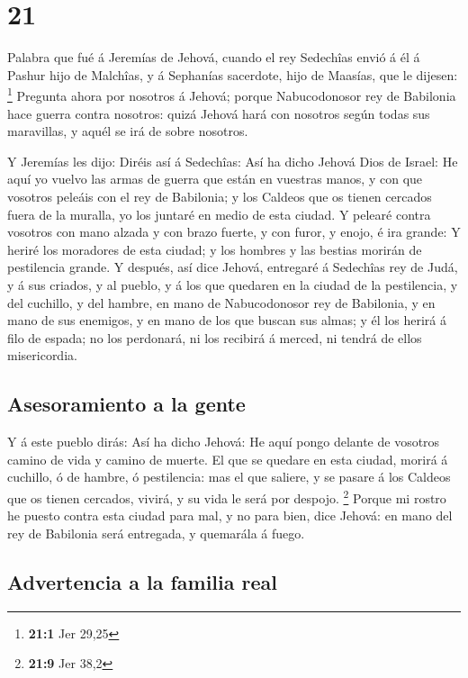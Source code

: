 \hypertarget{section-20}{%
\section{21}\label{section-20}}

 Palabra que fué á Jeremías de Jehová, cuando el rey
Sedechîas envió á él á Pashur hijo de Malchîas, y á Sephanías sacerdote,
hijo de Maasías, que le dijesen: \footnote{\textbf{21:1} Jer 29,25}
 Pregunta ahora por nosotros á Jehová; porque Nabucodonosor
rey de Babilonia hace guerra contra nosotros: quizá Jehová hará con
nosotros según todas sus maravillas, y aquél se irá de sobre nosotros.

 Y Jeremías les dijo: Diréis así á Sedechîas: 
Así ha dicho Jehová Dios de Israel: He aquí yo vuelvo las armas de
guerra que están en vuestras manos, y con que vosotros peleáis con el
rey de Babilonia; y los Caldeos que os tienen cercados fuera de la
muralla, yo los juntaré en medio de esta ciudad.  Y pelearé
contra vosotros con mano alzada y con brazo fuerte, y con furor, y
enojo, é ira grande:  Y heriré los moradores de esta ciudad;
y los hombres y las bestias morirán de pestilencia grande. 
Y después, así dice Jehová, entregaré á Sedechîas rey de Judá, y á sus
criados, y al pueblo, y á los que quedaren en la ciudad de la
pestilencia, y del cuchillo, y del hambre, en mano de Nabucodonosor rey
de Babilonia, y en mano de sus enemigos, y en mano de los que buscan sus
almas; y él los herirá á filo de espada; no los perdonará, ni los
recibirá á merced, ni tendrá de ellos misericordia.

\hypertarget{asesoramiento-a-la-gente}{%
\subsection{Asesoramiento a la gente}\label{asesoramiento-a-la-gente}}

 Y á este pueblo dirás: Así ha dicho Jehová: He aquí pongo
delante de vosotros camino de vida y camino de muerte.  El
que se quedare en esta ciudad, morirá á cuchillo, ó de hambre, ó
pestilencia: mas el que saliere, y se pasare á los Caldeos que os tienen
cercados, vivirá, y su vida le será por despojo. \footnote{\textbf{21:9}
  Jer 38,2}  Porque mi rostro he puesto contra esta ciudad
para mal, y no para bien, dice Jehová: en mano del rey de Babilonia será
entregada, y quemarála á fuego.

\hypertarget{advertencia-a-la-familia-real}{%
\subsection{Advertencia a la familia
real}\label{advertencia-a-la-familia-real}}

